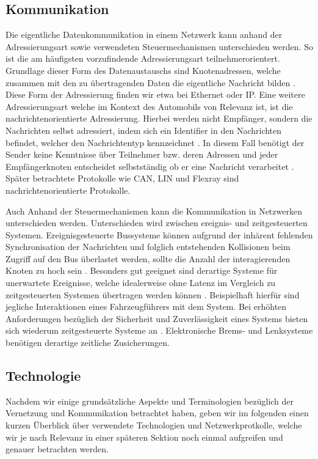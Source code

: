     \subsection{Kommunikation}
    Die eigentliche Datenkommunikation in einem Netzwerk kann anhand der Adressierungsart sowie verwendeten Steuermechanismen unterschieden werden. So ist
    die am häufigsten vorzufindende Adressierungsart teilnehmerorientert. Grundlage dieser Form des Datenaustauschs sind Knotenadressen, welche zusammen mit den
    zu übertragenden Daten die eigentliche Nachricht bilden \cite{Bosch}. Diese Form der Adressierung finden wir etwa bei Ethernet oder IP. Eine weitere Adressierungsart 
    welche im Kontext des Automobils von Relevanz ist, ist die nachrichtenorientierte Adressierung. Hierbei werden nicht Empfänger, sondern die Nachrichten selbst
    adressiert, indem sich ein Identifier in den Nachrichten befindet, welcher den Nachrichtentyp kennzeichnet \cite{Bosch}. In diesem Fall benötigt der Sender keine 
    Kenntnisse über Teilnehmer bzw. deren Adressen und jeder Empfängerknoten entscheidet selbstständig ob er eine Nachricht verarbeitet \cite{Bosch}. Später betrachtete
    Protokolle wie CAN, LIN und Flexray sind nachrichtenorientierte Protokolle.

    Auch Anhand der Steuermechanismen kann die Kommunikation in Netzwerken unterschieden werden. Unterschieden wird zwischen ereignis- und zeitgesteuerten Systemen.
    Ereignisgesteuerte Bussysteme können aufgrund der inhärent fehlenden Synchronisation der Nachrichten und folglich entstehenden Kollisionen beim Zugriff auf den Bus
    überlastet werden, sollte die Anzahl der interagierenden Knoten zu hoch sein \cite{Bosch}. Besonders gut geeignet sind derartige Systeme für unerwartete Ereignisse,
    welche idealerweise ohne Latenz im Vergleich zu zeitgesteuerten Systemen übertragen werden können \cite{Bosch}. Beispielhaft hierfür sind jegliche Interaktionen eines 
    Fahrzeugführers mit dem System. Bei erhöhten Anforderungen bezüglich der Sicherheit und Zuverlässigkeit eines Systems bieten sich wiederum zeitgesteuerte Systeme an \cite{Bosch}.
    Elektronische Brems- und Lenksysteme benötigen derartige zeitliche Zusicherungen.
    \subsection{Technologie}
    Nachdem wir einige grundsätzliche Aspekte und Terminologien bezüglich der Vernetzung und Kommunikation betrachtet haben, geben wir im folgenden einen kurzen Überblick
    über verwendete Technologien und Netzwerkprotkolle, welche wir je nach Relevanz in einer späteren Sektion noch einmal aufgreifen und genauer betrachten werden.
